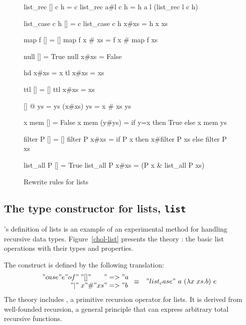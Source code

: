 \begin{figure}
\begin{ttbox}\makeatother
{}    list_rec [] c h = c  
   list_rec a#l c h = h a l (list_rec l c h)

   list_case c h [] = c 
  list_case c h x#xs = h x xs

         map f [] = []
        map f x \# xs = f x \# map f xs

        null [] = True
       null x#xs = False

         hd x#xs = x
         tl x#xs = xs

         ttl [] = []
        ttl x#xs = xs

      [] @ ys = ys
     (x#xs) \at ys = x # xs \at ys

         x mem [] = False
        x mem (y#ys) = if y=x then True else x mem ys

      filter P [] = []
     filter P x#xs = if P x then x#filter P xs else filter P xs

    list_all P [] = True
   list_all P x#xs = (P x & list_all P xs)
\end{ttbox}
\caption{Rewrite rules for lists} \label{chol-list-simps}
\end{figure}


\subsection{The type constructor for lists, {\tt list}}

\CHOL's definition of lists is an example of an experimental method for
handling recursive data types.  Figure~\ref{chol-list} presents the theory
: the basic list operations with their types and properties.

The  construct is defined by the following translation:
{\dquotes
\begin{eqnarray*}
  \begin{array}{r@{\;}l@{}l}
  "case " e " of" & "[]"    & " => " a\\
              "|" & x"\#"xs & " => " b
  \end{array} 
  & \equiv &
  "list_case"~a~(\lambda x\;xs.b)~e
\end{eqnarray*}}%
The theory includes , a primitive recursion operator
for lists.  It is derived from well-founded recursion, a general principle
that can express arbitrary total recursive functions.

